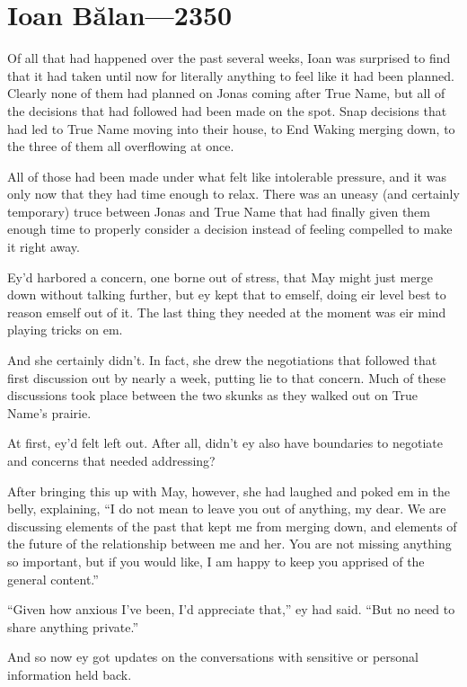 \hypertarget{ioan-bux103lan-2350}{%
\chapter{Ioan Bălan—2350}\label{ioan-bux103lan-2350}}

Of all that had happened over the past several weeks, Ioan was surprised to find that it had taken until now for literally anything to feel like it had been planned. Clearly none of them had planned on Jonas coming after True Name, but all of the decisions that had followed had been made on the spot. Snap decisions that had led to True Name moving into their house, to End Waking merging down, to the three of them all overflowing at once.

All of those had been made under what felt like intolerable pressure, and it was only now that they had time enough to relax. There was an uneasy (and certainly temporary) truce between Jonas and True Name that had finally given them enough time to properly consider a decision instead of feeling compelled to make it right away.

Ey'd harbored a concern, one borne out of stress, that May might just merge down without talking further, but ey kept that to emself, doing eir level best to reason emself out of it. The last thing they needed at the moment was eir mind playing tricks on em.

And she certainly didn't. In fact, she drew the negotiations that followed that first discussion out by nearly a week, putting lie to that concern. Much of these discussions took place between the two skunks as they walked out on True Name's prairie.

At first, ey'd felt left out. After all, didn't ey also have boundaries to negotiate and concerns that needed addressing?

After bringing this up with May, however, she had laughed and poked em in the belly, explaining, ``I do not mean to leave you out of anything, my dear. We are discussing elements of the past that kept me from merging down, and elements of the future of the relationship between me and her. You are not missing anything so important, but if you would like, I am happy to keep you apprised of the general content.''

``Given how anxious I've been, I'd appreciate that,'' ey had said. ``But no need to share anything private.''

And so now ey got updates on the conversations with sensitive or personal information held back.


